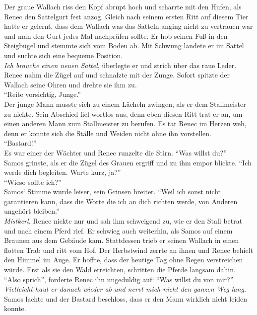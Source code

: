 Der graue Wallach riss den Kopf abrupt hoch und scharrte mit den Hufen, als Renec den Sattelgurt 
fest anzog. Gleich nach seinem ersten Ritt auf diesem Tier hatte er gelernt, dass dem Wallach was 
das Satteln anging nicht zu vertrauen war und man den Gurt jedes Mal nachprüfen sollte. Er hob 
seinen Fuß in den Steigbügel und stemmte sich vom Boden ab. Mit Schwung landete er im Sattel und 
suchte sich eine bequeme Position. \\
\textit{Ich brauche einen neuen Sattel}, überlegte er und strich über das raue Leder.\\
Renec nahm die Zügel auf und schnalzte mit der Zunge. Sofort spitzte der Wallach seine Ohren und 
drehte sie ihm zu.\\
``Reite vorsichtig, Junge.''\\
Der junge Mann musste sich zu einem Lächeln zwingen, als er dem Stallmeister zu nickte. Sein 
Abschied fiel wortlos aus, denn eben diesen Ritt trat er an, um einen anderen Mann zum Stallmeister 
zu berufen. Es tat Renec im Herzen weh, denn er konnte sich die Ställe und Weiden nicht ohne ihn 
vorstellen.\\
``Bastard!''\\
Es war einer der Wächter und Renec runzelte die Stirn. ``Was willst du?''\\
Samos grinste, als er die Zügel des Grauen ergriff und zu ihm empor blickte. ``Ich werde dich 
begleiten. Warte kurz, ja?''\\
``Wieso sollte ich?''\\
Samos‘ Stimme wurde leiser, sein Grinsen breiter. ``Weil ich sonst nicht garantieren kann, dass die 
Worte die ich an dich richten werde, von Anderen ungehört bleiben.''\\
\textit{Mistkerl.}
Renec nickte nur und sah ihm schweigend zu, wie er den Stall betrat und nach einem Pferd rief. Er 
schwieg auch weiterhin, als Samos auf einem Braunen aus dem Gebäude kam. Stattdessen trieb er 
seinen Wallach in einen flotten Trab und ritt vom Hof. Der Herbstwind zerrte an ihnen und Renec 
behielt den Himmel im Auge. Er hoffte, dass der heutige Tag ohne Regen verstreichen würde. Erst als 
sie den Wald erreichten, schritten die Pferde langsam dahin.\\
``Also sprich'', forderte Renec ihn ungeduldig auf: ``Was willst du von mir?''\\
\textit{Vielleicht haut er danach wieder ab und nervt mich nicht den ganzen Weg lang.}\\
Samos lachte und der Bastard beschloss, dass er den Mann wirklich nicht leiden konnte.\\
